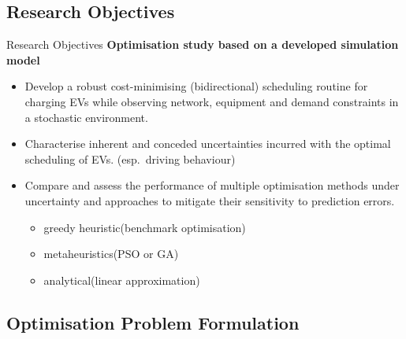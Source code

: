 \documentclass[handout]{beamer}
\begin{document}
\subsection{Research Objectives}


\begin{frame}{Research Objectives}
	\textbf{Optimisation study based on a developed simulation model}\pause
	\begin{itemize}
		\item Develop a \textcolor{UOEyellow}{robust} \textcolor{UOEgreen}{cost-minimising} \textcolor{UOEblue2}{(bidirectional)} scheduling routine for charging EVs \textcolor{UOEred}{while observing network, equipment and demand constraints} \textcolor{UOEyellow}{in a stochastic environment}.\pause
		\item Characterise inherent and conceded uncertainties incurred with the optimal scheduling of EVs. \textcolor{UOEblue2}{(esp.\ driving behaviour)}\pause
		\item Compare and assess the performance of multiple optimisation methods under uncertainty and approaches to mitigate their sensitivity to prediction errors.
		\begin{itemize}
			\item greedy heuristic\tab \textcolor{UOEblue2}{(benchmark optimisation)}
			\item metaheuristics\tab \textcolor{UOEblue2}{(PSO or GA)}
			\item analytical\tab \textcolor{UOEblue2}{(linear approximation)}
		\end{itemize}
	\end{itemize}
\end{frame}

\subsection{Optimisation Problem Formulation}
\end{document}
